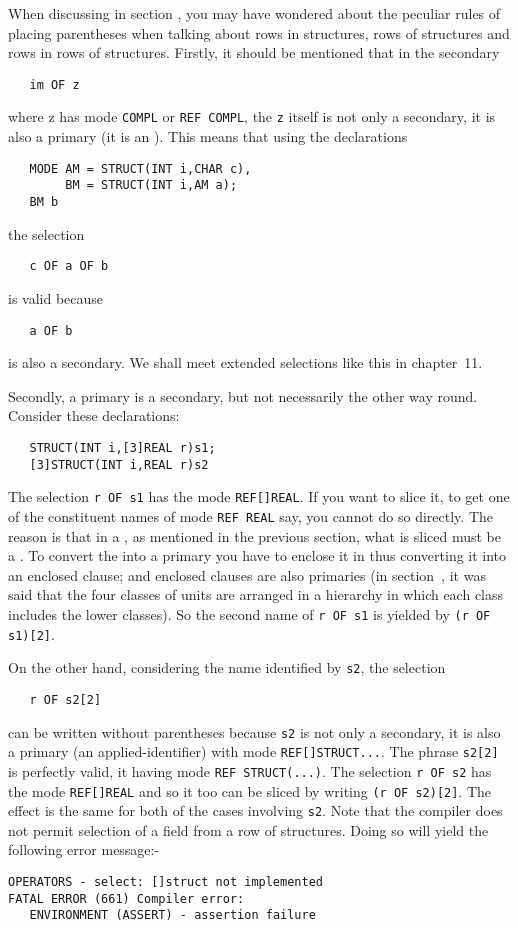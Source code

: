 %
When discussing  in section
, you may have wondered about the peculiar rules of
placing parentheses when talking about rows in structures, rows of
structures and rows in rows of structures.  Firstly, it should be
mentioned that in the secondary
\begin{verbatim}
   im OF z
\end{verbatim}
\noindent
where z has mode \verb|COMPL| or \verb|REF COMPL|, the \verb|z|
itself is not only a secondary, it is also a primary (it is an
). This means that using
the declarations
\begin{verbatim}
   MODE AM = STRUCT(INT i,CHAR c),
        BM = STRUCT(INT i,AM a);
   BM b
\end{verbatim}
\noindent
the selection
\begin{verbatim}
   c OF a OF b
\end{verbatim}
\noindent
is valid because
\begin{verbatim}
   a OF b
\end{verbatim}
\noindent
is also a secondary. We shall meet extended selections like this in
chapter~11.

Secondly, a primary is a secondary, but not necessarily the other way
round.  Consider these declarations:
\begin{verbatim}
   STRUCT(INT i,[3]REAL r)s1;
   [3]STRUCT(INT i,REAL r)s2
\end{verbatim}
\noindent
The selection \verb|r OF s1| has the mode \verb|REF[]REAL|.  If you
want to slice it, to get one of the constituent names of mode
\verb|REF REAL| say, you cannot do so directly.  The reason is that
in a , as mentioned in the previous section, what is sliced
must be a .  To convert the  into a primary
you have to enclose it in  thus converting it into an
enclosed clause; and enclosed clauses are also primaries (in
section~, it was said that the four classes of
units are arranged in a hierarchy in which each class includes the
lower classes).  So the second name of \verb|r OF s1| is yielded by
\verb|(r OF s1)[2]|.

On the other hand, considering the name identified by \verb|s2|, the
selection
\begin{verbatim}
   r OF s2[2]
\end{verbatim}
\noindent
can be written without parentheses because \verb|s2| is not only a
secondary, it is also a primary (an applied-identifier) with mode
\verb|REF[]STRUCT...|. The phrase \verb|s2[2]| is perfectly valid, it
having mode \verb|REF STRUCT(...)|.  The selection \verb|r OF s2| has
the mode \verb|REF[]REAL| and so it too can be sliced by writing
\verb|(r OF s2)[2]|. The effect is the same for both of the cases
involving \verb|s2|. Note that the 
compiler does not permit selection of a field from a row of
structures. Doing so will yield the following error message:-
\begin{verbatim}
OPERATORS - select: []struct not implemented
FATAL ERROR (661) Compiler error:
   ENVIRONMENT (ASSERT) - assertion failure
\end{verbatim}

